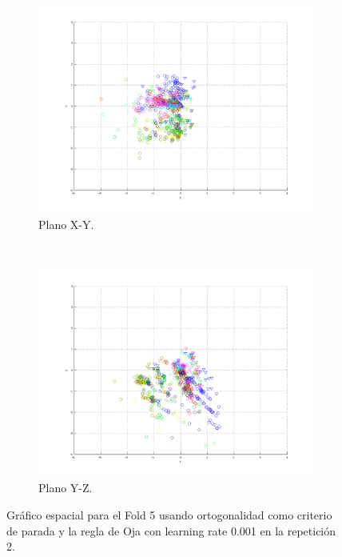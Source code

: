 \documentclass[informe.tex]{subfiles}
\begin{document}
\begin{figure}[H]
        \hspace*{-6.5cm}
        \begin{subfigure}[b]{0.49\textwidth}
                \includegraphics[width=\textwidth]{graficos/fold5_criterioParadao_reglaM_alpha0_rep2_2XY.png}
                \caption{Plano X-Y.}
        \end{subfigure}
        ~
        \begin{subfigure}[b]{0.49\textwidth}
                \includegraphics[width=\textwidth]{graficos/fold5_criterioParadao_reglaM_alpha0_rep2_3YZ.png}
                \caption{Plano Y-Z.}
        \end{subfigure}
	\restoregeometry
        \caption{Gráfico espacial para el Fold 5 usando ortogonalidad como criterio de parada y la regla de Oja con learning rate 0.001 en la repetición 2.}
        \label{fig:fold5_criterioParadao_reglaM_alpha0_rep2}
	\end{figure}
      
\end{document}
